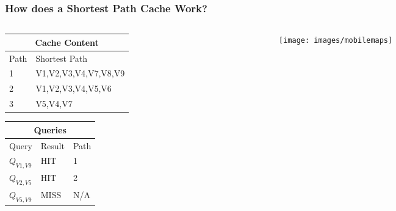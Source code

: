 \begin{frame}[red] %
\frametitle{How does a Shortest Path Cache Work?} %
\begin{columns}
  \begin{column}{0.5\textwidth}
\vspace{-1.5em}

\begin{tabularx}{\textwidth}{|l|X|} \hline
\multicolumn{2}{|c|}{\bf Cache Content} \\\hline \hline
Path & Shortest Path \\\hline
1 & V1,V2,V3,V4,V7,V8,V9 \\\hline
2 & V1,V2,V3,V4,V5,V6 \\\hline
3 & V5,V4,V7 \\\hline
\end{tabularx}

\vspace{2em}

\begin{tabularx}{\textwidth}{|l|l|X|} \hline
\multicolumn{3}{|c|}{\bf Queries} \\\hline \hline
Query & Result & Path \\\hline
$Q_{V1,V9}$ & HIT & 1\\\hline
$Q_{V2,V5}$ & HIT & 2\\\hline
$Q_{V5,V9}$ & MISS & N/A\\\hline
\end{tabularx}


  \end{column}
  \begin{column}[t]{0.5\textwidth}
  \vspace{-2.7em}
    \begin{figure}
    \texttt{[image: images/mobilemaps]} 
    \end{figure}  \end{column}
\end{columns}
\end{frame}


